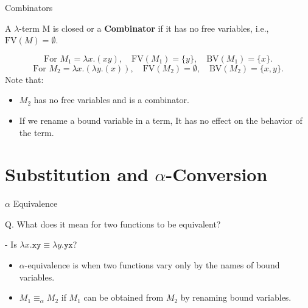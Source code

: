 \documentclass{beamer}
\begin{document}
\begin{frame}{Combinators}

  \begin{definition}
    A $\lambda$-term M is closed or a \textbf{Combinator} if it has no free variables, i.e., $\text{FV}(M) = \emptyset$.
  \end{definition}
  \vspace{1em}
  \[
  \text{For } M_1 = \lambda x. (xy), \quad \text{FV}(M_1)=\{y\},\quad \text{BV}(M_1)=\{x\}.
  \]
  \[
  \text{For } M_2 = \lambda x.(\lambda y. (x)), \quad \text{FV}(M_2)=\emptyset,\quad \text{BV}(M_2)=\{x,y\}.
  \]
  Note that:
  \begin{itemize}
    \item \(M_2\) has no free variables and is a combinator.
    \item If we rename a bound variable in a term, It has no effect on the behavior of the term.
  \end{itemize}
\end{frame}



\section{Substitution and $\alpha$-Conversion}
\begin{frame}{$\alpha$ Equivalence}
  \begin{block}{\strut}
  Q. What does it mean for two functions to be equivalent?
  \end{block}
  - Is $\lambda x.\mathtt{xy} \equiv \lambda y.\mathtt{yx}$?
  \begin{itemize}
    \item $\alpha$-equivalence is when two functions vary only by the names of bound variables.
    \item $M_1 \equiv_{\alpha} M_2$ if $M_1$ can be obtained from $M_2$ by renaming bound variables.
  \end{itemize}
\end{frame}
\end{document}

